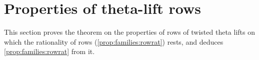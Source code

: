 \section{Properties of theta-lift rows}\label{sec:pf:rowprops}

\providecommand{\rowpropsBig}{\mathsf{Big}}
\providecommand{\rowpropsB}{\mathcal{B}_+}
\providecommand{\rowpropsL}{\mathcal{L}}
\providecommand{\rowpropsth}{\vartheta}
\providecommand{\rowpropsfd}{\mathcal{F}}
\providecommand{\rowpropsS}{\mathcal{S}}
\providecommand{\rowpropsSupp}{\mathrm{supp}}
\providecommand{\rowpropsctot}{c_{\mathrm{Tot}}}
\providecommand{\rowpropsXi}{\Xi}
\providecommand{\rowpropsemb}{\iota}
\providecommand{\rowpropsLL}{\mathit{LL}}
\providecommand{\rowpropsG}{\mathbf{G}}
\providecommand{\rowpropsgiven}{\gamma}
\providecommand{\rowpropsopp}{\gamma'}
\providecommand{\rowpropsdef}{\mathrm{def}}
\providecommand{\rowpropstot}{\mathrm{tot}}
\providecommand{\rowpropsper}{\mathrm{per}}
\providecommand{\rowpropsNIter}{\mathrm{It}}
\providecommand{\rowpropscw}{\mathrm{cw}}
\providecommand{\rowpropsclass}{\mathrm{cs}}
\providecommand{\rowpropsKbig}{K^{\mathrm{big}}}
\providecommand{\rowpropsKsmall}{K^{\mathrm{sm}}}
\providecommand{\rowpropsdeg}{\deg}
\providecommand{\rowpropsAf}{\A_{\mathrm f}}

This section proves the theorem on the properties of rows of twisted theta lifts on which the rationality of rows
(\cref{prop:families:rowrat}) rests, and deduces \cref{prop:families:rowrat} from it.

